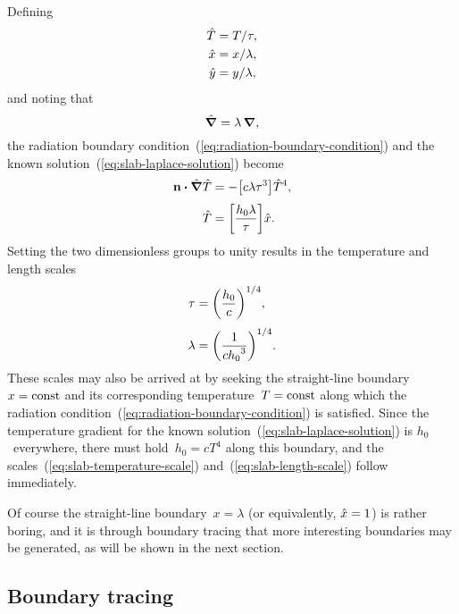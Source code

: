 Defining
\begin{align}
  \hat{T} &= T / \tau, \label{eq:slab-scaled-temperature} \\
  \hat{x} &= x / \lambda, \label{eq:slab-scaled-x} \\
  \hat{y} &= y / \lambda, \label{eq:slab-scaled-y}
\end{align}
and noting that
\begin{equation}
  \mathop{}\!\hat{\mathop{}\!\boldsymbol{\mathrm{\nabla}}} = \lambda \mathop{}\!\boldsymbol{\mathrm{\nabla}},
  \label{eq:slab-scaled-del}
\end{equation}
the radiation boundary condition~(\ref{eq:radiation-boundary-condition})
and the known solution~(\ref{eq:slab-laplace-solution})
become
\begin{align}
  \normalvec \dotp \scaleddel \scaled{T}
    &= -\squarebr*{c \lambda \tau^3} \scaled{T}^4,
    \label{eq:slab-scaled-radiation-boundary-condition-with-groups}
    \\[\fraclinespace]
  \scaled{T}
    &= \squarebr*{\frac{h_0 \lambda}{\tau}} \scaled{x}.
    \label{eq:slab-scaled-laplace-solution-with-groups}
\end{align}
Setting the two dimensionless groups to unity
results in the temperature and length scales
\begin{align}
  \tau &= \roundbr*{\frac{h_0}{c}}^{1/4},
    \label{eq:slab-temperature-scale} \\[\fraclinespace]
  \lambda &= \roundbr*{\frac{1}{c {h_0}^3}}^{1/4}.
    \label{eq:slab-length-scale}
\end{align}
These scales may also be arrived at
by seeking the straight-line boundary~$x = \mathrm{const}$
and its corresponding temperature~$T = \mathrm{const}$
along which the radiation condition~(\ref{eq:radiation-boundary-condition})
is satisfied.
Since the temperature gradient
for the known solution~(\ref{eq:slab-laplace-solution})
is $h_0$~everywhere,
there must hold~$h_0 = c T^4$ along this boundary,
and the scales~(\ref{eq:slab-temperature-scale})
and~(\ref{eq:slab-length-scale}) follow immediately.

Of course the straight-line boundary~$x = \lambda$
(or equivalently, $\hat{x} = 1$)
is rather boring,
and it is through boundary tracing
that more interesting boundaries may be generated,
as will be shown in the next section.

\subsection{Boundary tracing}
\label{sec:cartesian.slab.tracing}

